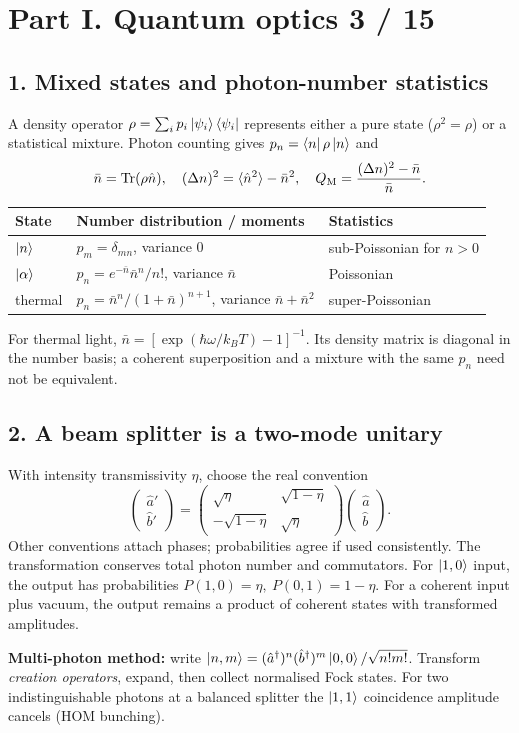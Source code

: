 
\section*{Part I. Quantum optics \hfill 3 / 15}
\subsection*{1. Mixed states and photon-number statistics}
A density operator \(\rho=\sum_i p_i\left\lvert \psi_i\right\rangle\left\langle \psi_i\right\rvert\)
represents either a pure state (\(\rho^2=\rho\)) or a statistical mixture.
Photon counting gives \(p_n=\left\langle n\right\rvert\rho\left\lvert n\right\rangle\) and
\[
\bar n=\operatorname{Tr}(\rho\hat n),\quad
(\Delta n)^2=\langle\hat n^2\rangle-\bar n^2,\quad
Q_{\rm M}=\frac{(\Delta n)^2-\bar n}{\bar n}.
\]
\begin{center}\small
\begin{tabular}{@{}lll@{}}\toprule
State & Number distribution / moments & Statistics\\\midrule
\(\left\lvert n\right\rangle\) & \(p_m=\delta_{mn}\), variance 0 & sub-Poissonian for \(n>0\)\\
\(\left\lvert \alpha\right\rangle\) & \(p_n=e^{-\bar n}\bar n^n/n!\), variance \(\bar n\) & Poissonian\\
thermal & \(p_n=\bar n^n/(1+\bar n)^{n+1}\), variance \(\bar n+\bar n^2\) & super-Poissonian\\\bottomrule
\end{tabular}
\end{center}
For thermal light,
\(\bar n=[\exp(\hbar\omega/k_BT)-1]^{-1}\).
Its density matrix is diagonal in the number basis; a coherent
superposition and a mixture with the same \(p_n\) need not be equivalent.

\subsection*{2. A beam splitter is a two-mode unitary}
With intensity transmissivity \(\eta\), choose the real convention
\[
\boxed{\begin{pmatrix}\hat a'\\\hat b'\end{pmatrix}=
\begin{pmatrix}\sqrt\eta&\sqrt{1-\eta}\\
-\sqrt{1-\eta}&\sqrt\eta\end{pmatrix}
\begin{pmatrix}\hat a\\\hat b\end{pmatrix}.}
\]
Other conventions attach phases; probabilities agree if used consistently.
The transformation conserves total photon number and commutators.
For \(\left\lvert 1,0\right\rangle\) input, the output has
probabilities \(P(1,0)=\eta,\ P(0,1)=1-\eta\).
For a coherent input plus vacuum, the output remains a product
of coherent states with transformed amplitudes.
\begin{methodbox}
\textbf{Multi-photon method:} write
\(\left\lvert n,m\right\rangle=(\hat a^\dagger)^n(\hat b^\dagger)^m
\left\lvert 0,0\right\rangle/\sqrt{n!m!}\).
Transform \emph{creation operators}, expand, then collect
normalised Fock states. For two indistinguishable photons at a balanced
splitter the \(\left\lvert 1,1\right\rangle\) coincidence amplitude cancels (HOM bunching).
\end{methodbox}
